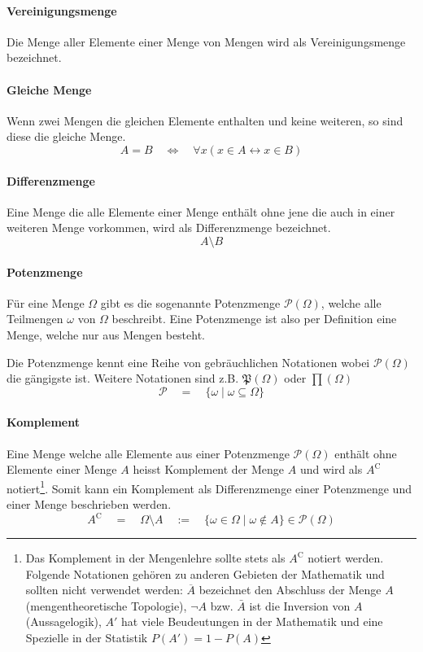 \paragraph{Vereinigungsmenge} Die Menge aller Elemente einer Menge
von Mengen wird als \gls{Vereinigungsmenge} bezeichnet.

\paragraph{Gleiche Menge} Wenn zwei Mengen die gleichen Elemente
enthalten und keine weiteren, so sind diese die \gls{gleiche Menge}.
\[  
	A = B 
	\quad \Leftrightarrow \quad 
	\forall x (x \in A \leftrightarrow x \in B)
\]

\paragraph{Differenzmenge}
Eine Menge die alle Elemente einer Menge enthält ohne jene die auch
in einer weiteren Menge vorkommen, wird als \gls{Differenzmenge} 
bezeichnet.
\[
	A \setminus B 
\]

\paragraph{Potenzmenge}
Für eine Menge $\Omega$ gibt es die sogenannte \gls{Potenzmenge} 
$\mathcal{P}(\Omega)$, welche alle Teilmengen $\omega$ von $\Omega$ 
beschreibt.
Eine Potenzmenge ist also per Definition eine Menge, welche nur
aus Mengen besteht. 

Die Potenzmenge kennt eine Reihe von gebräuchlichen
Notationen wobei $\mathcal{P}(\Omega)$ die gängigste ist. Weitere 
Notationen sind z.B. $\mathfrak{P}(\Omega)$ oder $\prod(\Omega)$
\[ 
	\mathcal{P} 
		\quad = \quad \{\omega \mid \omega \subseteq \Omega \}
\]

\paragraph{Komplement}
Eine Menge welche alle Elemente aus einer Potenzmenge 
$\mathcal{P}(\Omega)$
enthält ohne Elemente einer Menge $A$ heisst \gls{Komplement} der 
Menge $A$ und wird als $A^\mathrm C$ notiert\footnote{Das Komplement in 
der Mengenlehre sollte stets als $A^{\mathrm C}$ notiert werden. Folgende
Notationen gehören zu anderen Gebieten der Mathematik und sollten 
nicht verwendet werden: 
$\overline{A}$ bezeichnet den Abschluss der Menge $A$ (mengentheoretische 
Topologie), $\lnot A$ bzw. $\bar{A}$ ist die Inversion von $A$ 
(Aussagelogik), 
$A'$ hat viele Beudeutungen in der Mathematik und eine 
Spezielle in der Statistik $P(A')=1-P(A)$}. Somit kann ein Komplement 
als Differenzmenge einer Potenzmenge und einer Menge beschrieben werden.
\[  
	A^{\mathrm C} 
		\quad = \quad \Omega \setminus A 
		\quad := \quad \{\omega\in\Omega \mid \omega\notin A\} 
			\in\mathcal{P}(\Omega)
\]

